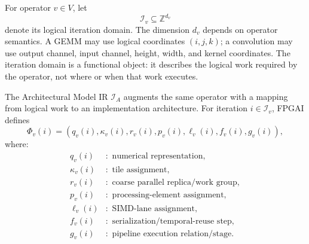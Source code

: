 \documentclass{article}
\begin{document}
For operator $v\in V$, let
\begin{equation}
\mathcal{I}_v\subseteq\mathbb{Z}^{d_v}
\label{eq:iteration-domain}
\end{equation}
denote its logical iteration domain. The dimension $d_v$ depends on operator semantics. A GEMM may use logical coordinates $(i,j,k)$; a convolution may use output channel, input channel, height, width, and kernel coordinates. The iteration domain is a functional object: it describes the logical work required by the operator, not where or when that work executes.


The Architectural Model IR $\mathcal{I}_{A}$ augments the same operator with a mapping from logical work to an implementation architecture. For iteration $i\in\mathcal{I}_v$, FPGAI defines
\begin{equation}
\Phi_v(i)=
\left(
q_v(i),
\kappa_v(i),
r_v(i),
p_v(i),
\ell_v(i),
f_v(i),
g_v(i)
\right),
\label{eq:phi}
\end{equation}
where:
\begin{align}
q_v(i) &:\text{ numerical representation},\\
\kappa_v(i) &:\text{ tile assignment},\\
r_v(i) &:\text{ coarse parallel replica/work group},\\
p_v(i) &:\text{ processing-element assignment},\\
\ell_v(i) &:\text{ SIMD-lane assignment},\\
f_v(i) &:\text{ serialization/temporal-reuse step},\\
g_v(i) &:\text{ pipeline execution relation/stage}.
\end{align}
\end{document}
